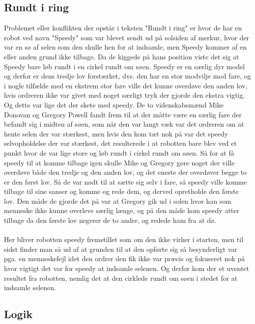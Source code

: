 \subsection{Rundt i ring}

Problemet eller konflikten der opstår i teksten "Rundt i ring" er hvor de har en robot ved navn "Speedy" som var blevet sendt ud på solsiden af merkur,
hvor der var en sø af selen som den skulle hen for at indsamle, men Speedy kommer af en eller anden grund ikke tilbage. Da de kiggede på hans position viste det sig
at Speedy bare løb rundt i en cirkel rundt om søen. Speedy er en særlig dyr model og derfor er dens tredje lov forstærket, dvs. den har en stor modvilje mod
fare, og i nogle tilfælde med en ekstrem stor fare ville det kunne overdøve den anden lov, hvis ordreren ikke var givet med noget særligt tryk der gjorde den
ekstra vigtig. Og dette var lige det der skete med speedy. De to videnskabsmænd Mike Donovan og Gregory Powell fandt frem til at der måtte være en særlig fare der befandt
sig i midten af søen, som når den var langt væk var det ordreren om at hente selen der var stærkest, men hvis den kom tæt nok på var det speedy selvopholdelse
der var stærkest, det resulterede i at robotten bare blev ved et punkt hvor de var lige store og løb rundt i cirkel rundt om søen. Så for at få speedy til at komme tilbage igen
skulle Mike og Gregory gøre noget der ville overdøve både den tredje og den anden lov, og det eneste der overdøver begge to er den først lov. Så de var nødt til at sætte
sig selv i fare, så speedy ville komme tilbage til sine sanser og komme og rede dem, og derved opretholde den første lov. Den måde de gjorde det på var at Gregory gik ud i solen
hvor han som menneske ikke kunne overleve særlig længe, og på den måde kom speedy atter tilbage da den første lov negerer de to andre, og redede ham fra at dø.
\\
\\
Her bliver robotten speedy fremstillet som om den ikke virker i starten, men til sidst finder man så ud af at grunden til at den opførte sig så besynderligt var pga. en menneskefejl idet
den ordrer den fik ikke var præcis og fokuseret nok på hvor vigtigt det var for speedy at indsamle selenen. Og derfor kom der et uventet resultet fra robotten, nemlig det at den cirklede
rundt om søen i stedet for at indsamle selenen.

\subsection{Logik}

